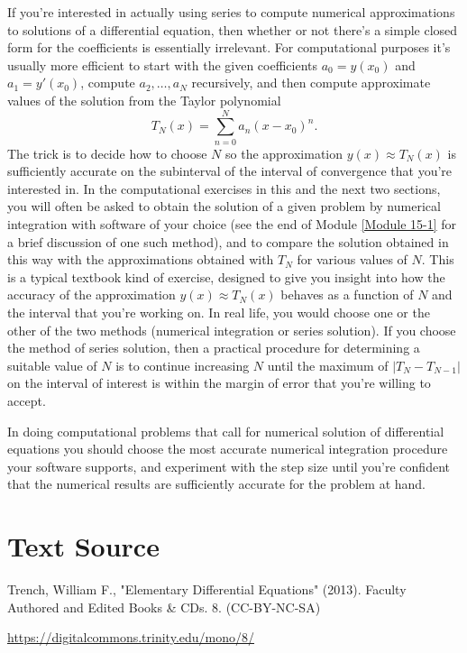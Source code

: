 \documentclass{ximera}
\begin{document}
If you're interested in actually using series to compute numerical
approximations to solutions of a differential equation, then whether
or not there's a simple closed form for the coefficients is
essentially irrelevant. For computational purposes it's usually
more efficient to start with the given coefficients $a_0=y(x_0)$ and
$a_1=y'(x_0)$, compute $a_2, \dots, a_N$ recursively,
 and then compute approximate values of the solution from the
Taylor polynomial
$$
T_N(x)=\sum_{n=0}^Na_n(x-x_0)^n.
$$
The trick is to decide how to choose $N$ so the approximation
$y(x)\approx T_N(x)$ is sufficiently accurate on the subinterval of
the interval of convergence that you're interested in. In the
computational exercises in this  and the next two sections,
you will often be asked to obtain the solution of a given problem by
numerical integration with  software  of your choice (see
the end of Module \ref{Module 15-1}%
for a brief discussion of one such method),
and to compare the solution obtained in this way with the
approximations obtained with $T_N$ for various values of $N$. This is
a typical textbook kind of exercise, designed to give you insight into
how the accuracy of the approximation $y(x)\approx T_N(x)$ behaves as
a function of $N$ and the interval that you're working on. In real
life, you would choose one or the other of the two methods (numerical
integration or series solution). If you choose the method of series
solution, then a practical procedure for determining a suitable value
of $N$ is to continue increasing $N$ until the maximum of
$|T_N-T_{N-1}|$ on the interval of interest is within the margin of
error that you're willing to accept.

In doing computational problems  that call for
numerical solution of differential equations you should
choose the most accurate numerical integration procedure your
software supports, and experiment with the step size until
you're confident that the numerical results are sufficiently
accurate for the problem at hand.




\section*{Text Source}
Trench, William F., "Elementary Differential Equations" (2013). Faculty Authored and Edited Books \& CDs. 8. (CC-BY-NC-SA)

\href{https://digitalcommons.trinity.edu/mono/8/}{https://digitalcommons.trinity.edu/mono/8/}
\end{document}
